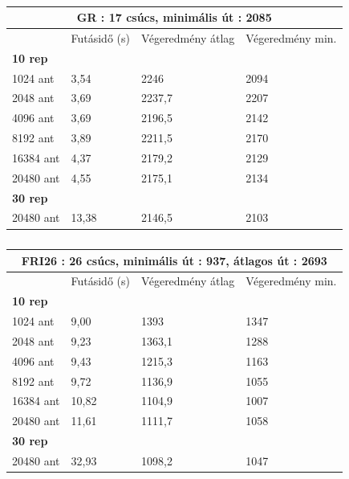 \begin{table}[ht!]
	\centering
	\begin{tabular}{|p{2cm}||p{3cm}|p{3.5cm}|p{3.5cm}|}
		\hline
		\multicolumn{4}{|c|}{GR : 17 csúcs, minimális út : 2085} \\
		\hline
		& Futásidő (s) & Végeredmény átlag & Végeredmény min.\\
		\hline
		\textbf{10 rep} & & & \\
		1024 ant & 3,54 & 2246 & 2094\\
		2048 ant & 3,69 & 2237,7 & 2207\\
		4096 ant & 3,69 & 2196,5 & 2142\\
		8192 ant & 3,89 & 2211,5 & 2170\\
		16384 ant & 4,37 & 2179,2 & 2129\\
		20480 ant & 4,55 & 2175,1 & 2134 \\
		\hline
		\textbf{30 rep} & & & \\
		20480 ant & 13,38 & 2146,5 & 2103 \\
		\hline
	\end{tabular}
	\caption{}
	\label{table:TSPv2_17}
\end{table}

\begin{table}[ht!]
	\centering
	\begin{tabular}{|p{2cm}||p{3cm}|p{3.5cm}|p{3.5cm}|}
		\hline
		\multicolumn{4}{|c|}{FRI26 : 26 csúcs, minimális út : 937, átlagos út : 2693} \\
		\hline
		& Futásidő (s) & Végeredmény átlag & Végeredmény min.\\
		\hline
		\textbf{10 rep} & & & \\
		1024 ant & 9,00 & 1393 & 1347\\
		2048 ant & 9,23 & 1363,1 & 1288\\
		4096 ant & 9,43 & 1215,3 & 1163\\
		8192 ant & 9,72 & 1136,9 & 1055\\
		16384 ant & 10,82 & 1104,9 & 1007\\
		20480 ant & 11,61 & 1111,7 & 1058 \\
		\hline
		\textbf{30 rep} & & & \\
		20480 ant & 32,93 & 1098,2 & 1047 \\
		\hline
	\end{tabular}
	\caption{}
	\label{table:TSPv2_26}
\end{table}

